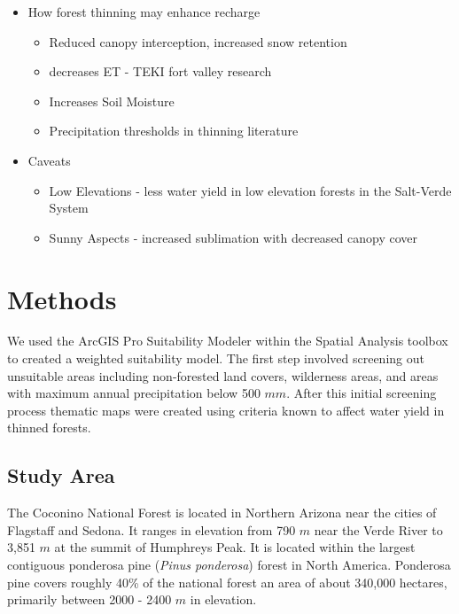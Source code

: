 \documentclass[
  number]{elsarticle}
\begin{document}
\begin{itemize}
\item
  How forest thinning may enhance recharge

  \begin{itemize}
  \item
    Reduced canopy interception, increased snow retention
  \item
    decreases ET - TEKI fort valley research
  \item
    Increases Soil Moisture
  \item
    Precipitation thresholds in thinning literature
  \end{itemize}
\item
  Caveats

  \begin{itemize}
  \item
    Low Elevations - less water yield in low elevation forests in the
    Salt-Verde System \citep{biederman_streamflow_2022}
  \item
    Sunny Aspects - increased sublimation with decreased canopy cover
    \citep{biederman_recent_2015}
  \end{itemize}
\end{itemize}

\section{Methods}\label{methods}

We used the ArcGIS Pro Suitability Modeler within the Spatial Analysis
toolbox to created a weighted suitability model. The first step involved
screening out unsuitable areas including non-forested land covers,
wilderness areas, and areas with maximum annual precipitation below 500
\(mm\). After this initial screening process thematic maps were created
using criteria known to affect water yield in thinned forests.

\subsection{Study Area}\label{study-area}

The Coconino National Forest is located in Northern Arizona near the
cities of Flagstaff and Sedona. It ranges in elevation from 790 \(m\)
near the Verde River to 3,851 \(m\) at the summit of Humphreys Peak. It
is located within the largest contiguous ponderosa pine (\emph{Pinus
ponderosa}) forest in North America. Ponderosa pine covers roughly 40\%
of the national forest an area of about 340,000 hectares, primarily
between 2000 - 2400 \(m\) in elevation.
\end{document}
